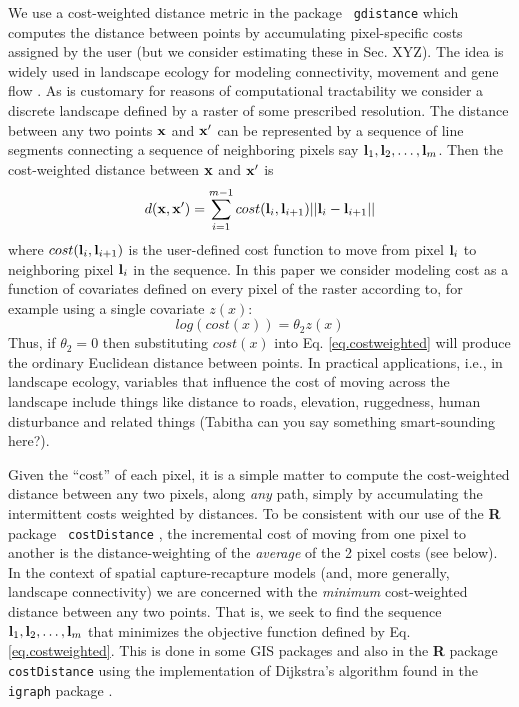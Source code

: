 \documentclass[12pt]{article}
\begin{document}
We use a cost-weighted distance metric in the package \mbox{\tt
gdistance}  which computes the distance 
between points by accumulating pixel-specific costs assigned by the user 
(but we consider estimating these in Sec. XYZ). The idea is widely used in
landscape ecology for modeling connectivity, movement and gene flow
\citep{adriaensen_etal:2003,mcrae_etal:2008}. As is customary for reasons of
computational tractability we consider a discrete landscape defined by a 
raster of some prescribed resolution. The distance between any two points 
${\bf x}$ and ${\bf x}'$ can be represented by a sequence of line segments 
connecting a sequence of neighboring  pixels say 
${\bf l}_{1},{\bf l}_{2},\ldots,{\bf l}_{m}$. Then the cost-weighted distance 
between ${\bf x}$ and ${\bf x}'$ is
\begin{equation}
 d({\bf x},{\bf x}')
  =  \sum_{i=1}^{m-1} cost({\bf l}_{i},{\bf l}_{i+1})||{\bf l}_{i} - {\bf l}_{i+1}||
\label{eq.costweighted}
\end{equation}
where $cost({\bf l}_{i},{\bf l}_{i+1})$ is the user-defined cost function
to move 
from pixel ${\bf l}_{i}$ to neighboring pixel ${\bf l}_{i}$ in the sequence.
In this paper we consider modeling cost as a function of covariates
defined on every pixel of the raster according to, for example using a
single
covariate $z(x)$:
\begin{equation}
 log(cost(x))=  \theta_{2} z(x) 
\label{eq.cost}
\end{equation}
Thus, if $\theta_{2} = 0$ then substituting $cost(x)$ into
Eq. \ref{eq.costweighted} will produce the ordinary Euclidean distance
between points. 
In practical applications, i.e., in landscape ecology, variables that
influence the cost of moving across the landscape include things like
distance to roads, elevation, ruggedness, human disturbance and
related things (Tabitha can you say something smart-sounding here?).

Given the ``cost'' of each pixel, it is a simple matter to compute the
cost-weighted distance between any two pixels, along {\it any} path,
simply by accumulating the intermittent costs weighted by distances. 
To be consistent with our use of the {\bf R} package \mbox{\tt
  costDistance} \citep{vanetten:2011},
the incremental cost of moving from one pixel to another is the
distance-weighting of the {\it average} of the 2 pixel costs (see below).
In the context of spatial capture-recapture models (and, more
generally, landscape connectivity) we are concerned with the {\it
  minimum} cost-weighted distance between any two points.  That is, we
seek to find the 
sequence ${\bf l}_{1},{\bf l}_{2},\ldots,{\bf l}_{m}$ that minimizes
the objective function defined by Eq. \ref{eq.costweighted}.
This is done in some GIS packages and also in the {\bf R} package
\mbox{\tt costDistance} using the implementation of Dijkstra's algorithm \citep{dijkstra:1959}
found in the \mbox{\tt igraph} package \citep{csardi:2010}.
\end{document}
